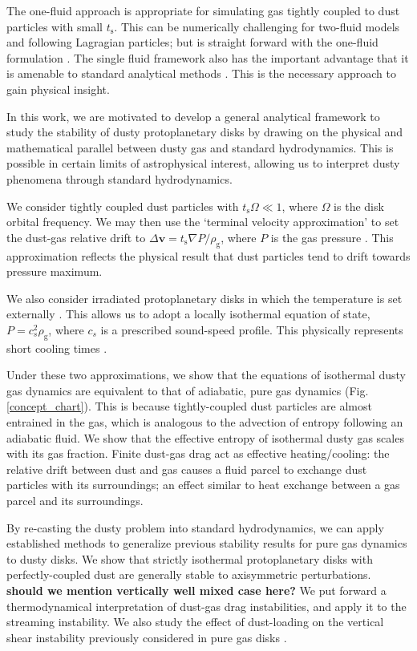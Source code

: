 \documentclass[iop, numberedappendix]{emulateapj}
\newcommand{\rhog}{\rho_\mathrm{g}}
\newcommand{\tstop}{t_\mathrm{s}}
\begin{document}
The one-fluid approach is appropriate for 
simulating gas tightly coupled to dust particles with small $\tstop$.  
This can be numerically challenging for two-fluid models and 
following Lagragian particles; but is straight forward with the 
one-fluid formulation \citep{price15}.  The single fluid framework 
also has the important advantage that it is 
amenable to standard analytical methods \citep{youdin05a,jacquet11}.  
This is the necessary approach to gain physical insight.  


In this work, we are motivated to develop a general analytical
framework to study the stability of dusty protoplanetary 
disks by drawing on the physical and mathematical parallel between
dusty gas and standard hydrodynamics. This is possible in certain limits of astrophysical
interest, allowing us to interpret dusty phenomena through standard
hydrodynamics.   

We consider tightly coupled dust particles with $\tstop\Omega\ll
1$, where $\Omega$ is the disk orbital frequency. We may then use the
`terminal velocity approximation' to set the dust-gas relative drift
to $\Delta \bm{v} = \tstop\nabla
P/\rhog$, where $P$ is the gas pressure \citep{youdin05a, 
  jacquet11,laibe14}. This approximation reflects the physical result
that dust particles tend to drift towards pressure maximum. 
 
 We also consider irradiated protoplanetary disks 
 in which the temperature is set externally
\citep{chiang97,stam08}. This allows us to adopt a locally isothermal
equation of state, $P = c_s^2\rhog$, where $c_s$ is a prescribed
sound-speed profile. This physically represents short cooling times
\citep{lin15}.   

Under these two approximations, we show that the equations of 
isothermal dusty gas dynamics are equivalent to that of adiabatic, pure gas
dynamics (Fig. \ref{concept_chart}). This is because tightly-coupled dust particles are almost
entrained in the gas, which is analogous to the advection
of entropy following an adiabatic fluid. We show that the   
effective entropy of isothermal dusty gas scales with its gas
fraction. Finite dust-gas drag act as effective heating/cooling: the relative
drift between dust and gas causes a fluid parcel to exchange dust
particles with its surroundings; an effect similar to heat exchange
between a gas parcel and its surroundings.   


By re-casting the dusty problem into standard  
hydrodynamics, we can apply established methods to generalize previous stability 
results for pure gas dynamics to dusty disks.  
We show that strictly isothermal protoplanetary disks with
perfectly-coupled dust are generally 
stable to axisymmetric perturbations.%
{\bf should we mention vertically well mixed case here?} 
We put forward a thermodynamical interpretation of 
dust-gas drag instabilities, and apply it to the streaming instability.   
We also study the effect of dust-loading on the vertical shear
instability previously considered in pure gas disks
\citep[VSI,][]{nelson13,lin15,barker15}.  
\end{document}
